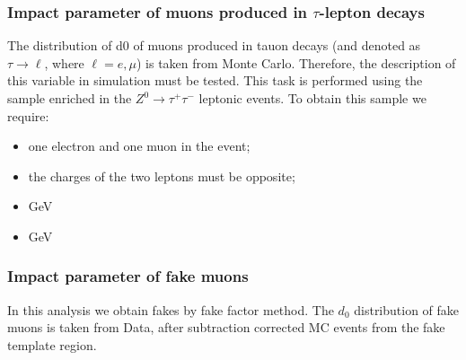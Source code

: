 
\subsubsection{Impact parameter of muons produced in $\tau$-lepton decays}
\label{sec:d0calibration_of_tau_muons}

The distribution of d0 of muons produced in tauon decays (and denoted as $\tau \rightarrow \ell$, where $\ell = e, \mu$) is taken from Monte Carlo.
Therefore, the description of this variable in simulation must be tested.
This task is performed using the sample enriched in the $Z^{0}\rightarrow\tau^{+}\tau^{-}$ leptonic events.
To obtain this sample we require:
\begin{itemize}
\item one electron and one muon in the event;
\item the charges of the two leptons must be opposite;
\item {} GeV
\item {} GeV
\end{itemize}






\subsubsection{Impact parameter of fake muons}
\label{sec:d0calibration_of_fake_muons}

In this analysis we obtain fakes by fake factor method. 
The $d_0$ distribution of fake muons is taken from Data, after subtraction corrected MC events from the fake template region.



